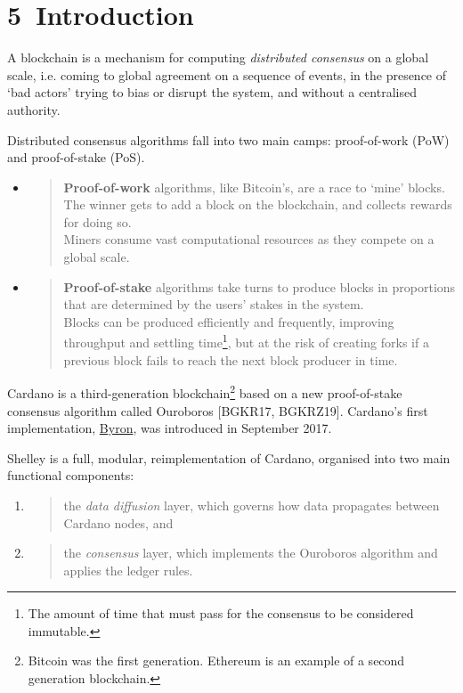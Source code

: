 \documentclass[11pt,a4paper]{article}
\begin{document}
\hypertarget{introduction}{%
\section{​5​~Introduction}\label{introduction}}

A blockchain is a mechanism for computing \emph{distributed consensus}
on a global scale, i.e. coming to global agreement on a sequence of
events, in the presence of `bad actors' trying to bias or disrupt the
system, and without a centralised authority.

Distributed consensus algorithms fall into two main camps: proof-of-work
(PoW) and proof-of-stake (PoS).

\begin{itemize}
\item
  \begin{quote}
  \textbf{Proof-of-work} algorithms, like Bitcoin's, are a race to
  `mine' blocks. The winner gets to add a block on the blockchain, and
  collects rewards for doing so.\\
  Miners consume vast computational resources as they compete on a
  global scale.
  \end{quote}
\item
  \begin{quote}
  \textbf{Proof-of-stake} algorithms take turns to produce blocks in
  proportions that are determined by the users' stakes in the system.\\
  Blocks can be produced efficiently and frequently, improving
  throughput and settling time\footnote{The amount of time that must
    pass for the consensus to be considered immutable.}, but at the risk
  of creating forks if a previous block fails to reach the next block
  producer in time.
  \end{quote}
\end{itemize}

Cardano is a third-generation blockchain\footnote{Bitcoin was the first
  generation. Ethereum is an example of a second generation blockchain.}
based on a new proof-of-stake consensus algorithm called Ouroboros
{[}BGKR17, BGKRZ19{]}. Cardano's first implementation,
\href{https://cardanoroadmap.com/en/byron/}{{Byron}}, was introduced in
September 2017.

Shelley is a full, modular, reimplementation of Cardano, organised into
two main functional components:

\begin{enumerate}
\def\labelenumi{\arabic{enumi}.}
\item
  \begin{quote}
  the \emph{data diffusion} layer, which governs how data propagates
  between Cardano nodes, and
  \end{quote}
\item
  \begin{quote}
  the \emph{consensus} layer, which implements the Ouroboros algorithm
  and applies the ledger rules.
  \end{quote}
\end{enumerate}
\end{document}
